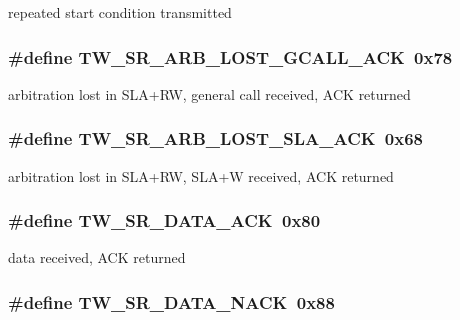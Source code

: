 \label{group__util__twi_ga8dce3e4b7e35355a8add9ed63d1fa3ab}
repeated start condition transmitted \hypertarget{group__util__twi_ga4756103341a65e0e3889996cdf15b2fa}{
\subsubsection[{TW\_\-SR\_\-ARB\_\-LOST\_\-GCALL\_\-ACK}]{\setlength{\rightskip}{0pt plus 5cm}\#define TW\_\-SR\_\-ARB\_\-LOST\_\-GCALL\_\-ACK~0x78}}
\label{group__util__twi_ga4756103341a65e0e3889996cdf15b2fa}
arbitration lost in SLA+RW, general call received, ACK returned \hypertarget{group__util__twi_ga1c3ed5ed345d17972002b9fd07f4f829}{
\subsubsection[{TW\_\-SR\_\-ARB\_\-LOST\_\-SLA\_\-ACK}]{\setlength{\rightskip}{0pt plus 5cm}\#define TW\_\-SR\_\-ARB\_\-LOST\_\-SLA\_\-ACK~0x68}}
\label{group__util__twi_ga1c3ed5ed345d17972002b9fd07f4f829}
arbitration lost in SLA+RW, SLA+W received, ACK returned \hypertarget{group__util__twi_gac50f1a59c74c3109d4913dbecfb472c1}{
\subsubsection[{TW\_\-SR\_\-DATA\_\-ACK}]{\setlength{\rightskip}{0pt plus 5cm}\#define TW\_\-SR\_\-DATA\_\-ACK~0x80}}
\label{group__util__twi_gac50f1a59c74c3109d4913dbecfb472c1}
data received, ACK returned \hypertarget{group__util__twi_ga6c0fa701fe9d96b0b7df29e8af154f94}{
\subsubsection[{TW\_\-SR\_\-DATA\_\-NACK}]{\setlength{\rightskip}{0pt plus 5cm}\#define TW\_\-SR\_\-DATA\_\-NACK~0x88}}
